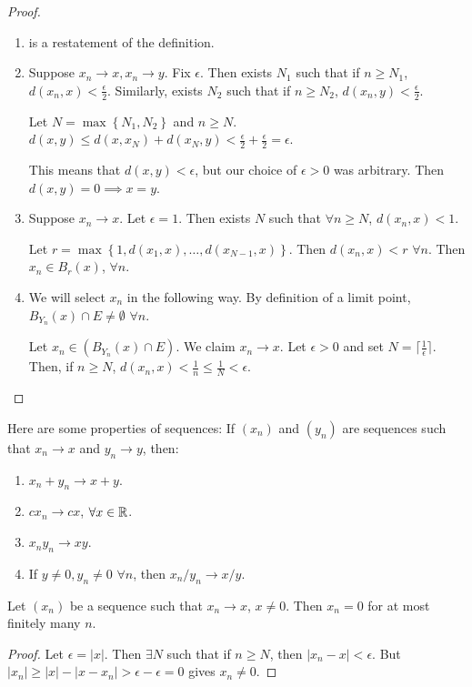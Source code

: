 \begin{proof}
    ~\begin{enumerate}[(1)]
        \item is a restatement of the definition.
        \item Suppose $x_n \to x, x_n\to y$. Fix $\epsilon$. Then exists $N_1$ such that if $n\geq N_1$, $d(x_n, x) < \frac{\epsilon}{2}$. Similarly, exists $N_2$ such that if $n\geq N_2$, $d(x_n, y) < \frac{\epsilon}{2}$.

              Let $N = \max\left\{ N_1, N_2 \right\}$ and $n\geq N$. $d(x, y)\leq d(x, x_N) + d(x_N, y) < \frac{\epsilon}{2}+ \frac{\epsilon}{2} = \epsilon$.

              This means that $d(x, y) < \epsilon$, but our choice of $\epsilon > 0$ was arbitrary. Then $d(x, y) = 0\implies x = y$.
        \item Suppose $x_n\to x$. Let $\epsilon = 1$. Then exists $N$ such that $\forall n\geq N$, $d(x_n,x) < 1$.

              Let $r = \max\left\{ 1, d(x_1, x), \dots, d(x_{N-1}, x) \right\}$. Then $d(x_n, x) < r$ $\forall n$. Then $x_n\in B_r(x)$, $\forall n$.
        \item We will select $x_n$ in the following way. By definition of a limit point, $B_{Y_n}(x)\cap E \neq \emptyset$ $\forall n$.

              Let $x_n \in (B_{Y_n}(x)\cap E)$. We claim $x_n\to x$. Let $\epsilon > 0$ and set $N = \lceil \frac{1}{\epsilon}\rceil$. Then, if $n\geq N$, $d(x_n, x) < \frac{1}{n} \leq \frac{1}{N}< \epsilon$.
    \end{enumerate}
\end{proof}

Here are some properties of sequences: If $(x_n)$ and $(y_n)$ are sequences such that $x_n\to x$ and $y_n\to y$, then:
\begin{enumerate}[(1)]
    \item $x_n + y_n \to x + y$.
    \item $cx_n\to cx$, $\forall x\in \mathbb R$.
    \item $x_ny_n \to xy$.
    \item If $y\neq 0, y_n\neq 0$ $\forall n$, then $x_n/y_n\to x/y$.
\end{enumerate}
\begin{lemma}
    Let $(x_n)$ be a sequence such that $x_n \to x$, $x\neq 0$. Then $x_n = 0$ for at most finitely many $n$.
\end{lemma}
\begin{proof}
    Let $\epsilon = |x|$. Then $\exists N$ such that if $n\geq N$, then $|x_n - x| < \epsilon$. But $|x_n| \geq |x| - |x - x_n| > \epsilon - \epsilon = 0$ gives $x_n\neq 0$.
\end{proof}

